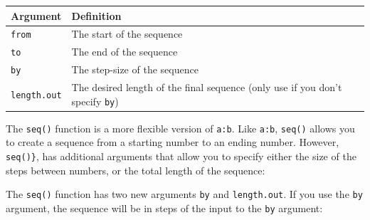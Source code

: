 \documentclass[]{book}
\theoremstyle{definition}
\theoremstyle{definition}
\theoremstyle{remark}
\begin{document}
\begin{longtable}[]{@{}ll@{}}
\toprule
\begin{minipage}[b]{0.35\columnwidth}\raggedright\strut
Argument\strut
\end{minipage} & \begin{minipage}[b]{0.41\columnwidth}\raggedright\strut
Definition\strut
\end{minipage}\tabularnewline
\midrule
\endhead
\begin{minipage}[t]{0.35\columnwidth}\raggedright\strut
\texttt{from}\strut
\end{minipage} & \begin{minipage}[t]{0.41\columnwidth}\raggedright\strut
The start of the sequence\strut
\end{minipage}\tabularnewline
\begin{minipage}[t]{0.35\columnwidth}\raggedright\strut
\texttt{to}\strut
\end{minipage} & \begin{minipage}[t]{0.41\columnwidth}\raggedright\strut
The end of the sequence\strut
\end{minipage}\tabularnewline
\begin{minipage}[t]{0.35\columnwidth}\raggedright\strut
\texttt{by}\strut
\end{minipage} & \begin{minipage}[t]{0.41\columnwidth}\raggedright\strut
The step-size of the sequence\strut
\end{minipage}\tabularnewline
\begin{minipage}[t]{0.35\columnwidth}\raggedright\strut
\texttt{length.out}\strut
\end{minipage} & \begin{minipage}[t]{0.41\columnwidth}\raggedright\strut
The desired length of the final sequence (only use if you don't specify
\texttt{by})\strut
\end{minipage}\tabularnewline
\bottomrule
\end{longtable}

The \texttt{seq()} function is a more flexible version of \texttt{a:b}.
Like \texttt{a:b}, \texttt{seq()} allows you to create a sequence from a
starting number to an ending number. However, \texttt{seq()\}}, has
additional arguments that allow you to specify either the size of the
steps between numbers, or the total length of the sequence:

The \texttt{seq()} function has two new arguments \texttt{by} and
\texttt{length.out}. If you use the \texttt{by} argument, the sequence
will be in steps of the input to the \texttt{by} argument:
\end{document}
